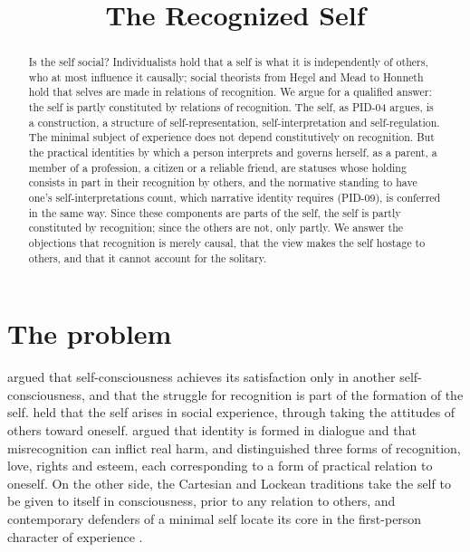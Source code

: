 \documentclass{situationist-preprint}
\title{The Recognized Self}
\begin{document}
\maketitle

\begin{abstract}
Is the self social? Individualists hold that a self is what it is independently of others, who at most influence it causally; social theorists from Hegel and Mead to Honneth hold that selves are made in relations of recognition. We argue for a qualified answer: the self is partly constituted by relations of recognition. The self, as PID-04 argues, is a construction, a structure of self-representation, self-interpretation and self-regulation. The minimal subject of experience does not depend constitutively on recognition. But the practical identities by which a person interprets and governs herself, as a parent, a member of a profession, a citizen or a reliable friend, are statuses whose holding consists in part in their recognition by others, and the normative standing to have one's self-interpretations count, which narrative identity requires (PID-09), is conferred in the same way. Since these components are parts of the self, the self is partly constituted by recognition; since the others are not, only partly. We answer the objections that recognition is merely causal, that the view makes the self hostage to others, and that it cannot account for the solitary.
\end{abstract}

\section{The problem}

\citet[§§178--196]{Hegel1807} argued that self-consciousness achieves its satisfaction only in another self-consciousness, and that the struggle for recognition is part of the formation of the self. \citet{Mead1934} held that the self arises in social experience, through taking the attitudes of others toward oneself. \citet{Taylor1994} argued that identity is formed in dialogue and that misrecognition can inflict real harm, and \citet{Honneth1995} distinguished three forms of recognition, love, rights and esteem, each corresponding to a form of practical relation to oneself. On the other side, the Cartesian and Lockean traditions take the self to be given to itself in consciousness, prior to any relation to others, and contemporary defenders of a minimal self locate its core in the first-person character of experience \citep{GStrawson1997}.
\end{document}
